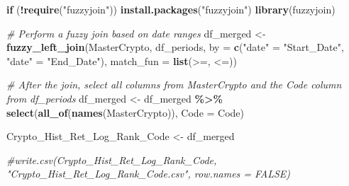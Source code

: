 \documentclass[
]{article}
\newenvironment{Shaded}{\begin{snugshade}}{\end{snugshade}}
\newcommand{\AttributeTok}[1]{\textcolor[rgb]{0.13,0.29,0.53}{#1}}
\newcommand{\CommentTok}[1]{\textcolor[rgb]{0.56,0.35,0.01}{\textit{#1}}}
\newcommand{\ControlFlowTok}[1]{\textcolor[rgb]{0.13,0.29,0.53}{\textbf{#1}}}
\newcommand{\FunctionTok}[1]{\textcolor[rgb]{0.13,0.29,0.53}{\textbf{#1}}}
\newcommand{\NormalTok}[1]{#1}
\newcommand{\OtherTok}[1]{\textcolor[rgb]{0.56,0.35,0.01}{#1}}
\newcommand{\SpecialCharTok}[1]{\textcolor[rgb]{0.81,0.36,0.00}{\textbf{#1}}}
\newcommand{\StringTok}[1]{\textcolor[rgb]{0.31,0.60,0.02}{#1}}
\begin{document}
\begin{Shaded}
\end{Shaded}

\begin{Shaded}
\begin{Highlighting}[]
\ControlFlowTok{if}\NormalTok{ (}\SpecialCharTok{!}\FunctionTok{require}\NormalTok{(}\StringTok{"fuzzyjoin"}\NormalTok{)) }\FunctionTok{install.packages}\NormalTok{(}\StringTok{"fuzzyjoin"}\NormalTok{)}
\FunctionTok{library}\NormalTok{(fuzzyjoin)}

\CommentTok{\# Perform a fuzzy join based on date ranges}
\NormalTok{df\_merged }\OtherTok{\textless{}{-}} \FunctionTok{fuzzy\_left\_join}\NormalTok{(MasterCrypto, df\_periods,}
                             \AttributeTok{by =} \FunctionTok{c}\NormalTok{(}\StringTok{"date"} \OtherTok{=} \StringTok{"Start\_Date"}\NormalTok{, }\StringTok{"date"} \OtherTok{=} \StringTok{"End\_Date"}\NormalTok{),}
                             \AttributeTok{match\_fun =} \FunctionTok{list}\NormalTok{(}\StringTok{\textasciigrave{}}\AttributeTok{\textgreater{}=}\StringTok{\textasciigrave{}}\NormalTok{, }\StringTok{\textasciigrave{}}\AttributeTok{\textless{}=}\StringTok{\textasciigrave{}}\NormalTok{))}

\CommentTok{\# After the join, select all columns from MasterCrypto and the Code column from df\_periods}
\NormalTok{df\_merged }\OtherTok{\textless{}{-}}\NormalTok{ df\_merged }\SpecialCharTok{\%\textgreater{}\%}
  \FunctionTok{select}\NormalTok{(}\FunctionTok{all\_of}\NormalTok{(}\FunctionTok{names}\NormalTok{(MasterCrypto)), }\AttributeTok{Code =}\NormalTok{ Code)}

\NormalTok{Crypto\_Hist\_Ret\_Log\_Rank\_Code }\OtherTok{\textless{}{-}}\NormalTok{ df\_merged}

\CommentTok{\#write.csv(Crypto\_Hist\_Ret\_Log\_Rank\_Code, "Crypto\_Hist\_Ret\_Log\_Rank\_Code.csv", row.names = FALSE)}
\end{Highlighting}
\end{Shaded}
\end{document}
